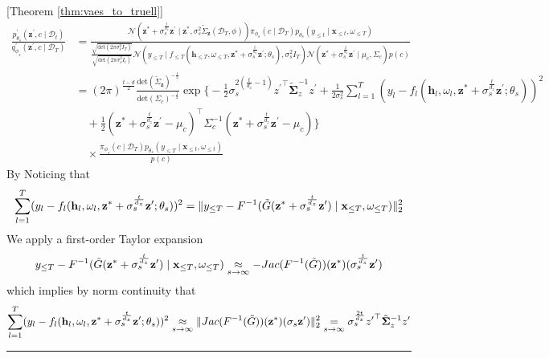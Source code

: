 \documentclass[10pt]{article} %
\newcommand{\BlackBox}{\rule{1.5ex}{1.5ex}}  %
\renewenvironment{proof}{\par\noindent{\bf Proof\ }}{\hfill\BlackBox\\[2mm]}
\newenvironment{proof}{\par\noindent{\bf Proof\ }}{\hfill\BlackBox\\[2mm]}
\begin{document}
\begin{proof}[Theorem \ref{thm:vaes_to_truell}]
\begin{align*}
\frac{
p_{\theta_{s}}^{\prime}\left(\mathbf{z}^{\prime}, c \mid \mathcal{D}_t\right)
}{
q_{\phi_{s}}^{\prime}(\mathbf{z}^{\prime}, c \mid \mathcal{D}_T)
} 
&= \frac{
\mathcal{N}\left(
        \mathbf{z}^*+ \sigma_{s}^{\frac{t}{d_z}} \mathbf{z}^{\prime} \mid \mathbf{z}^*,         
         \sigma_{s}^{2}  \tilde{\Sigma}_{\mathbf{z}}(\mathcal{D}_T, \phi) 
        \right) 
        \pi_{\phi_{s}}(c \mid \mathcal{D}_T) p_{\theta_{s}}\left(y_{\leq t} \mid \mathbf{x}_{\leq t}, \omega_{\leq T}\right)
}{
\frac{
\sqrt{\mathrm{det}(2\pi\sigma_s^2I_T)}
}{
\sqrt{\mathrm{det}(2\pi\sigma_s^2I_t)}
}\mathcal{N}\left(
            y_{\leq T} \mid f_{\leq T}(\mathbf{h}_{\leq T}, \omega_{\leq T}, \mathbf{z}^*+ \sigma_{s}^{\frac{t}{d_z}} \mathbf{z}^{\prime}; \theta_{s}), \sigma_{s}^2I_T
        \right)
\mathcal{N}(\mathbf{z}^*+ \sigma_{s}^{\frac{t}{d_z}} \mathbf{z}^{\prime} \mid \mu_c, \Sigma_c)p(c)
} \\
&= (2\pi)^{\frac{t-d}{2}}\frac{
            \mathrm{det}(\tilde{\Sigma}_{\mathbf{z}})^{-\frac{1}{2}}
            }{
            \mathrm{det}(\Sigma_{c})^{-\frac{1}{2}}
            } \exp \Bigg\{ -\frac{1}{2}\sigma_{s}^{2(\frac{t}{d_z}-1)}{z^{\prime}}^{\top} \tilde{\mathbf{\Sigma}}_z^{-1} z^{\prime}  +  \frac{1}{2\sigma_s^2}\sum_{l=1}^{T}(y_l - f_l(\mathbf{h}_l, \omega_l, \mathbf{z}^*+ \sigma_{s}^{\frac{t}{d_z}} \mathbf{z}^{\prime}; \theta_{s}))^2\\
&\quad+ \frac{1}{2}(\mathbf{z}^*+ \sigma_{s}^{\frac{t}{d_z}} \mathbf{z}^{\prime} -\mu_c)^{\top} \Sigma_c^{-1} (\mathbf{z}^*+ \sigma_{s}^{\frac{t}{d_z}}  \mathbf{z}^{\prime} -\mu_c)\Bigg\} \\
&\quad \times \frac{\pi_{\phi_{s}}(c \mid \mathcal{D}_T) p_{\theta_{s}}\left(y_{\leq T} \mid \mathbf{x}_{\leq t}, \omega_{\leq t}\right)}{p(c)}
\end{align*}
By Noticing that 
\[
\sum_{l=1}^{T}(y_l - f_l(\mathbf{h}_l, \omega_l, \mathbf{z}^*+ \sigma_{s}^{\frac{t}{d_z}} \mathbf{z}^{\prime}; \theta_{s}))^2  = \|y_{\leq T} - F^{-1}(\Tilde{G}(\mathbf{z}^* + \sigma_{s}^{\frac{t}{d_z}} \mathbf{z}^{\prime}) \mid \mathbf{x}_{\leq T}, \omega_{\leq T})\|_2^2
\]
We apply a first-order Taylor expansion
\[
y_{\leq T} - F^{-1}(\Tilde{G}(\mathbf{z}^* + \sigma_{s}^{\frac{t}{d_z}} \mathbf{z}^{\prime}) \mid \mathbf{x}_{\leq T}, \omega_{\leq T})  \underset{s \to \infty}{\approx} -Jac(F^{-1}(\Tilde{G}))(\mathbf{z}^*)(\sigma_{s}^{\frac{t}{d_z}} \mathbf{z}^{\prime})
\]
which implies by norm continuity that
\[
\sum_{l=1}^{T}(y_l - f_l(\mathbf{h}_l, \omega_l, \mathbf{z}^*+ \sigma_{s}^{\frac{t}{d_z}} \mathbf{z}^{\prime}; \theta_{s}))^2 \underset{s \to \infty}{\approx} \| Jac(F^{-1}(\Tilde{G}))(\mathbf{z}^*)(\sigma_{s} \mathbf{z}^{\prime})\|_2^2 \underset{s \to \infty}{=} \sigma_{s}^{\frac{2t}{d_z}} {z^{\prime}}^{\top} \tilde{\mathbf{\Sigma}}_z^{-1} z^{\prime}
\]
\end{proof}
\end{document}
